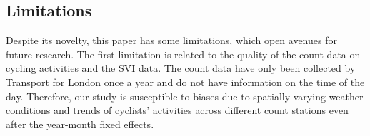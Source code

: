 \documentclass[preprint,12pt, authoryear]{elsarticle}
\begin{document}

\clearpage
\subsection{Limitations}
Despite its novelty, this paper has some limitations, which open avenues for future research.
The first limitation is related to the quality of the count data on cycling activities and the SVI data.
The count data have only been collected by Transport for London once a year and do not have information on the time of the day. 
Therefore, our study is susceptible to biases due to spatially varying weather conditions and trends of cyclists' activities across different count stations even after the year-month fixed effects. 
\end{document}
